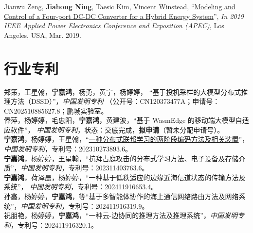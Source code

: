 \documentclass{resume}
\begin{document}
Jianwu Zeng, \textbf{Jiahong Ning}, Taesic Kim, Vincent Winstead, “\href{https://doi.org/10.1109/APEC.2019.8722323}{Modeling and Control of a Four-port DC-DC Converter for a Hybrid Energy System}”, \emph{In 2019 IEEE Applied Power Electronics Conference and Exposition (APEC)}, Los Angeles, USA, Mar. 2019.\\

\vspace{3mm}
\section{行业专利}

郑策，王星翰，\textbf{宁嘉鸿}，杨勇，黄宁，杨婷婷，
``基于投机采样的大模型分布式推理方法（DSSD）''，\emph{中国发明专利}
（公开号：CN120373477A；申请号：CN202510885627.8；鹏城实验室。\\
 
 俸萍，杨婷婷，毛忠阳，\textbf{宁嘉鸿}，黄建波，``基于 WasmEdge 的移动端大模型自适应软件''，
\emph{中国发明专利}，状态：交底完成，\textbf{拟申请}（暂未分配申请号）。\\

\textbf{宁嘉鸿}，杨婷婷，王星翰，``\href{https://www.patentguru.com/cn/CN116484980A}{一种分布式联邦学习的两阶段编码方法及相关装置}''，\emph{中国发明专利}，专利号：202310273893.6。\\

\textbf{宁嘉鸿}，杨婷婷，王星翰，``抗拜占庭攻击的分布式学习方法、电子设备及存储介质''，\emph{中国发明专利}，专利号：202311403763.6。\\

\textbf{宁嘉鸿}，荷泽晨，杨婷婷，``一种基于低秩适应的边缘近海信道状态的传输方法及系统''，
\emph{中国发明专利}，专利号：202411916653.4。\\

孙鑫，杨婷婷，\textbf{宁嘉鸿}，等``基于多智能体协作的海上通信网络路由方法及网络系统''，\emph{中国发明专利}，专利号：202411916319.9。\\

祝朋艳，杨婷婷，\textbf{宁嘉鸿}，``一种云-边协同的推理方法及推理系统''，\emph{中国发明专利}，专利号：202411916320.1。\\
\end{document}
